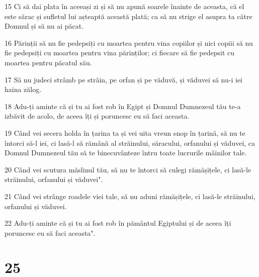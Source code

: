 \par 15 Ci să dai plata în aceeași zi și să nu apună soarele înainte de aceasta, că el este sărac și sufletul lui așteaptă această plată; ca să nu strige el asupra ta către Domnul și să nu ai păcat.
\par 16 Părinții să nu fie pedepsiți cu moartea pentru vina copiilor și nici copiii să nu fie pedepsiți cu moartea pentru vina părinților; ci fiecare să fie pedepsit cu moartea pentru păcatul său.
\par 17 Să nu judeci strâmb pe străin, pe orfan și pe văduvă, și văduvei să nu-i iei haina zălog.
\par 18 Adu-ți aminte că și tu ai fost rob în Egipt și Domnul Dumnezeul tău te-a izbăvit de acolo, de aceea îți și poruncesc eu să faci aceasta.
\par 19 Când vei secera holda în țarina ta și vei uita vreun snop în țarină, să nu te întorci să-l iei, ci lasă-l să rămână al străinului, săracului, orfanului și văduvei, ca Domnul Dumnezeul tău să te binecuvânteze întru toate lucrurile mâinilor tale.
\par 20 Când vei scutura măslinul tău, să nu te întorci să culegi rămășițele, ci lasă-le străinului, orfanului și văduvei".
\par 21 Când vei strânge roadele viei tale, să nu aduni rămășițele, ci lasă-le străinului, orfanului și văduvei.
\par 22 Adu-ți aminte că și tu ai fost rob în pământul Egiptului și de aceea îți poruncesc eu să faci aceasta".

\chapter{25}

